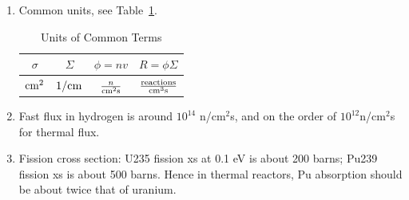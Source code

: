 \documentclass{school-22.211-notes}
\begin{document}





\clearpage
\begin{enumerate}
\item Common units, see Table~\ref{units}.
\begin{table}
  \centering
  \begin{tabular}{|c|c|c|c|} \hline
   $\sigma$ & $\Sigma$ & $\phi = nv$ & $R = \phi \Sigma$  \\ \hline
   $\mathrm{cm}^2$ & $1/\mathrm{cm}$ & $\frac{n}{\mathrm{cm}^2 \mathrm{s}}$ & $\frac{\mathrm{reactions}}{\mathrm{cm}^3 \mathrm{s}}$ \\ \hline
  \end{tabular}
  \caption{Units of Common Terms} \label{units}
\end{table}
\item Fast flux in hydrogen is around $10^{14}$ n/cm$^2$s, and on the order of $10^{12}$n/cm$^2$s for thermal flux. 

\item Fission cross section: U235 fission xs at 0.1 eV is about 200 barns; Pu239 fission xs is about 500 barns. Hence in thermal reactors, Pu absorption should be about twice that of uranium. 


\end{enumerate}
\end{document}
